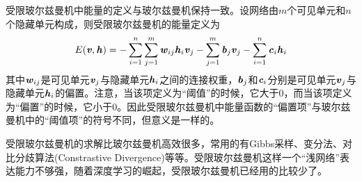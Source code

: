 受限玻尔兹曼机中能量的定义与玻尔兹曼机保持一致。设网络由$m$个可见单元和$n$个隐藏单元构成，则受限玻尔兹曼机的能量定义为
\begin{eqnarray}
E(\Vv,\Vh) = -\sum_{i=1}^{n}\sum_{j=1}^{m}\Vw_{ij}\Vh_{i}\Vv_{j} - \sum_{j=1}^{m}\Vb_{j}\Vv_{j} - \sum_{i=1}^{n}\Vc_{i}\Vh_{i}
\end{eqnarray}
其中$\Vw_{ij}$是可见单元$\Vv_{j}$与隐藏单元$\Vh_{i}$之间的连接权重，$\Vb_{j}$和$\Vc_{i}$分别是可见单元$\Vv_{j}$与隐藏单元$\Vh_{i}$的偏置。注意，当该项定义为“阈值”的时候，它大于$0$，而当该项定义为“偏置”的时候，它小于$0$。因此受限玻尔兹曼机中能量函数的“偏置项”与玻尔兹曼机中的“阈值项”的符号不同，但意义是一样的。

受限玻尔兹曼机的求解比玻尔兹曼机高效很多，常用的有Gibbs采样、变分法、对比分歧算法(Constrastive Divergence)等等。受限玻尔兹曼机这样一个“浅网络”表达能力不够强，随着深度学习的崛起，受限玻尔兹曼机已经用的比较少了。